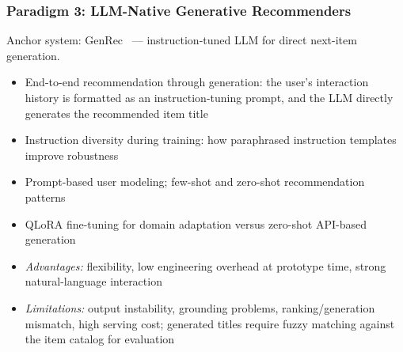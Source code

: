 \documentclass[sigconf,nonacm]{acmart}
\begin{document}
\subsubsection{Paradigm 3: LLM-Native Generative Recommenders}
Anchor system: GenRec~\cite{ji2024genrec} --- instruction-tuned LLM for direct next-item generation.
\begin{itemize}
    \item End-to-end recommendation through generation: the user's interaction history is formatted as an instruction-tuning prompt, and the LLM directly generates the recommended item title
    \item Instruction diversity during training: how paraphrased instruction templates improve robustness
    \item Prompt-based user modeling; few-shot and zero-shot recommendation patterns
    \item QLoRA fine-tuning for domain adaptation versus zero-shot API-based generation
    \item \textit{Advantages:} flexibility, low engineering overhead at prototype time, strong natural-language interaction
    \item \textit{Limitations:} output instability, grounding problems, ranking/generation mismatch, high serving cost; generated titles require fuzzy matching against the item catalog for evaluation
\end{itemize}
\end{document}

